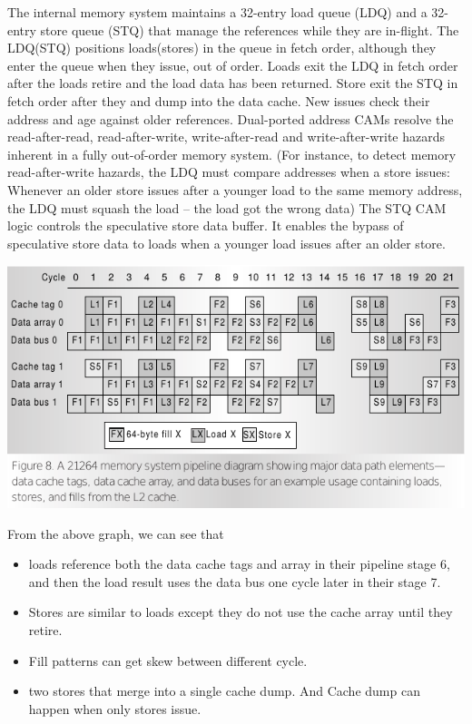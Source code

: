 \documentclass[11pt]{article}
\newcommand{\note}[1]{\scriptsize{#1}\normalsize}
\begin{document}
\begin{itemize}
\begin{enumerate}
		The internal memory system maintains a 32-entry load queue (LDQ) and a 32-entry store queue (STQ) that manage the references while they are in-flight. The LDQ(STQ) positions loads(stores) in the queue in fetch order, although they enter the queue when they issue, out of order. Loads exit the LDQ in fetch order after the loads retire and the load data has been returned. Store exit the STQ in fetch order after they and dump into the data cache. New issues check their address and age against older references. Dual-ported address CAMs resolve the read-after-read, read-after-write, write-after-read and write-after-write hazards inherent in a fully out-of-order memory system. 
		(\note{For instance, to detect memory read-after-write hazards, the LDQ must compare addresses when a store issues: Whenever an older store issues after a younger load to the same memory address, the LDQ must squash the load -- the load got the wrong data}) The STQ CAM logic controls the speculative store data buffer. It enables the bypass of speculative store data to loads when a younger load issues after an older store.
		\begin{center}
			\includegraphics[width=\linewidth]{timing_logic_graph.png}
		\end{center}
		From the above graph, we can see that \begin{itemize}
			\item loads reference both the data cache tags and array in their pipeline stage 6, and then the load result uses the data bus one cycle later in their stage 7.
			\item Stores are similar to loads except they do not use the cache array until they retire.
			\item Fill patterns can get skew between different cycle.
			\item two stores that merge into a single cache dump. And Cache dump can happen when only stores issue. 

\end{itemize}
\end{enumerate}
\end{itemize}
\end{document}

